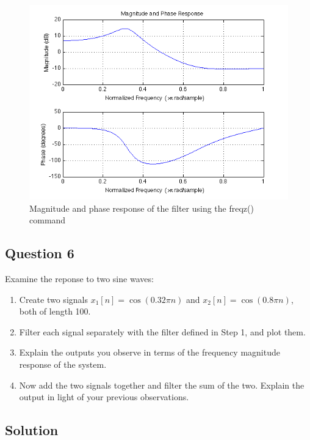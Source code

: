 \documentclass{article}
\begin{document}
\begin{figure}[here]
	\begin{center}
		\includegraphics [width=5in]{Project2_03.png}
		\caption{Magnitude and phase response of the filter using the freqz() command}
		\label{fig:freqz}
	\end{center}
\end{figure}

\newpage
\subsection*{Question 6}

\begin{par}
Examine the reponse to two sine waves:
\end{par} \vspace{1em}
\begin{enumerate}
\setlength{\itemsep}{-1ex}
   \item Create two signals $x_{1}[n] = \cos(0.32\pi n)$ and $x_{2}[n] = \cos(0.8 \pi n)$, both of length 100.
   \item Filter each signal separately with the filter defined in Step 1, and plot them.
   \item Explain the outputs you observe in terms of the frequency magnitude response of the system.
   \item Now add the two signals together and filter the sum of the two. Explain the output in light of your previous observations.
\end{enumerate}


\subsection*{Solution}
\end{document}
